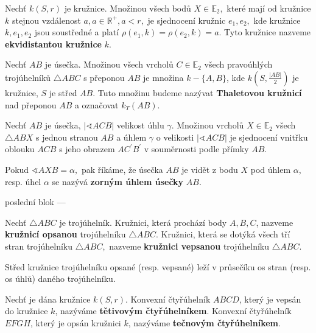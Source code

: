 \begin{definition}
  Nechť $k(S,r)$ je kružnice. Množinou všech bodů $X\in \mathbb E_2,$ které mají od kružnice $k$ stejnou vzdálenost $a, a \in \mathbb R^+, a< r,$ je sjednocení kružnic $e_1, e_2,$ kde kružnice $k,e_1,e_2$ jsou soustředné a platí $\rho(e_1,k)= \rho(e_2,k)=a.$ Tyto kružnice nazveme
  \textbf{ekvidistantou kružnice} $k$.
\end{definition}

\begin{definition}
  Nechť $AB$ je úsečka. Množinou všech vrcholů $C\in \mathbb E_2$ všech pravoúhlých trojúhelníků $\triangle ABC$ s přeponou $AB$ je množina $k-\{ A,B\}$, kde $k\left (S,\frac{|AB|}{2}\right )$ je kružnice, $S$ je střed $AB$. Tuto množinu budeme nazývat \textbf{Thaletovou kružnicí} nad přeponou $AB$ a označovat $k_T(AB).$
\end{definition}

\begin{veta}
  Nechť $AB$ je úsečka, $|\sphericalangle ACB|$ velikost úhlu $\gamma.$ Množinou vrcholů $X\in \mathbb E_2$ všech $\triangle ABX$ s jednou stranou $AB$ a úhlem $\gamma$ o velikosti $|\sphericalangle ACB|$ je sjednocení vnitřku oblouku $ACB$ s jeho obrazem $AC^\prime B^\prime$ v souměrnosti podle přímky $AB$.
\end{veta}

\begin{pozn}
  Pokud $\sphericalangle AXB = \alpha,$ pak říkáme, že úsečka $AB$ je vidět z bodu $X$ pod úhlem $\alpha$, resp. úhel $\alpha$ se nazývá \textbf{zorným úhlem úsečky} $AB.$
\end{pozn}

poslední blok ---
\begin{definition}
  Nechť $\triangle ABC$ je trojúhelník. Kružnici, která prochází body $A,B,C$, nazveme \textbf{kružnicí opsanou} trojúhelníku $\triangle ABC.$ Kružnici, která se dotýká všech tří stran trojúhelníku $\triangle ABC,$ nazveme \textbf{kružnici vepsanou} trojúhelníku $\triangle ABC.$
\end{definition}

\begin{veta}
  Střed kružnice trojúhelníku opsané (resp. vepsané) leží v průsečíku os stran (resp. os úhlů) daného trojúhelníku.
\end{veta}

\begin{definition}
  Nechť je dána kružnice $k(S,r).$ Konvexní čtyřúhelník $ABCD$, který je vepsán do kružnice $k$, nazýváme \textbf{tětivovým čtyřúhelníkem}. Konvexní čtyřúhelník $EFGH$, který je opsán kružnici $k$, nazýváme \textbf{tečnovým čtyřúhelníkem}.
\end{definition}

